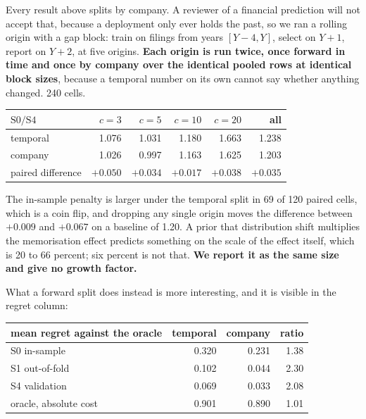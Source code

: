 \documentclass[11pt]{article}
\begin{document}
Every result above splits by company. A reviewer of a financial prediction will not accept that,
because a deployment only ever holds the past, so we ran a rolling origin with a gap block: train
on filings from years $[Y{-}4, Y]$, select on $Y{+}1$, report on $Y{+}2$, at five origins.
\textbf{Each origin is run twice, once forward in time and once by company over the identical
pooled rows at identical block sizes}, because a temporal number on its own cannot say whether
anything changed. 240 cells.

\begin{center}\small
\begin{tabular}{lrrrrr}
\toprule
$\mathrm{S0}/\mathrm{S4}$ & $c{=}3$ & $c{=}5$ & $c{=}10$ & $c{=}20$ & all \\
\midrule
temporal            & 1.076 & 1.031 & 1.180 & 1.663 & 1.238 \\
company             & 1.026 & 0.997 & 1.163 & 1.625 & 1.203 \\
paired difference   & $+0.050$ & $+0.034$ & $+0.017$ & $+0.038$ & $+0.035$ \\
\bottomrule
\end{tabular}
\end{center}

The in-sample penalty is larger under the temporal split in 69 of 120 paired cells, which is a
coin flip, and dropping any single origin moves the difference between $+0.009$ and $+0.067$ on a
baseline of 1.20. A prior that distribution shift multiplies the memorisation effect predicts
something on the scale of the effect itself, which is 20 to 66 percent; six percent is not that.
\textbf{We report it as the same size and give no growth factor.}

What a forward split does instead is more interesting, and it is visible in the regret column:

\begin{center}\small
\begin{tabular}{lrrr}
\toprule
mean regret against the oracle & temporal & company & ratio \\
\midrule
S0 in-sample         & 0.320 & 0.231 & 1.38 \\
S1 out-of-fold       & 0.102 & 0.044 & 2.30 \\
S4 validation        & 0.069 & 0.033 & 2.08 \\
\midrule
oracle, absolute cost & 0.901 & 0.890 & 1.01 \\
\bottomrule
\end{tabular}
\end{center}
\end{document}
